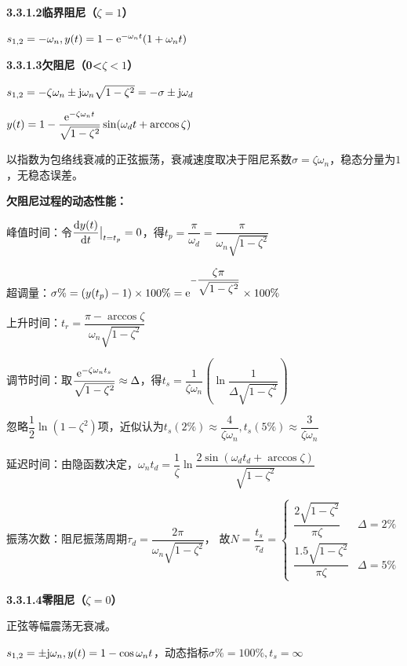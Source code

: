 \documentclass[11pt,a4paper]{ctexart}
\begin{document}
            {\setlength{\parindent}{0pt}\textbf{3.3.1.2\quad 临界阻尼（$\zeta=1$）}}

                $s_{1,2}=-\omega_n,y(t)=1-{\rm e}^{-\omega_nt}(1+\omega_nt)$

            {\setlength{\parindent}{0pt}\textbf{3.3.1.3\quad 欠阻尼（0<$\zeta<1$）}}

                $s_{1,2}=-\zeta\omega_n\pm{\rm j}\omega_n\sqrt{1-\zeta^2}=-\sigma\pm{\rm j}\omega_d$

                $y(t)=1-\dfrac{{\rm e}^{-\zeta\omega_nt}}{\sqrt{1-\zeta^2}}\sin(\omega_dt+\arccos\zeta)$

                以指数为包络线衰减的正弦振荡，衰减速度取决于阻尼系数$\sigma=\zeta\omega_n$，稳态分量为$1$，无稳态误差。

                \textbf{欠阻尼过程的动态性能：}

                峰值时间：令$\dfrac{{\rm d}y(t)}{{\rm d}t}\big|_{t=t_p}=0$，得$t_p=\dfrac{\pi}{\omega_d}=\dfrac{\pi}{\omega_n\sqrt{1-\zeta^2}}$

                超调量：$\sigma\%=(y(t_p)-1)\times100\%={\rm e}^{-\dfrac{\zeta\pi}{\sqrt{1-\zeta^2}}}\times100\%$

                上升时间：$t_r=\dfrac{\pi-\arccos\zeta}{\omega_n\sqrt{1-\zeta^2}}$

                调节时间：取$\dfrac{{\rm e}^{-\zeta\omega_nt_s}}{\sqrt{1-\zeta^2}}\approx\Delta$，得$t_s=\dfrac{1}{\zeta\omega_n}(\ln\dfrac{1}{\Delta\sqrt{1-\zeta^2}})$
                
                忽略$\dfrac12\ln(1-\zeta^2)$项，近似认为$t_s(2\%)\approx\dfrac{4}{\zeta\omega_n},t_s(5\%)\approx\dfrac{3}{\zeta\omega_n}$

                延迟时间：由隐函数决定，$\omega_nt_d=\dfrac{1}{\zeta}\ln\dfrac{2\sin(\omega_dt_d+\arccos\zeta)}{\sqrt{1-\zeta^2}}$

                振荡次数：阻尼振荡周期$\tau_d=\dfrac{2\pi}{\omega_n\sqrt{1-\zeta^2}}$，
                故$N=\dfrac{t_s}{\tau_d}=\begin{cases}\dfrac{2\sqrt{1-\zeta^2}}{\pi\zeta}&\Delta=2\%\\\dfrac{1.5\sqrt{1-\zeta^2}}{\pi\zeta}&\Delta=5\%\end{cases}$
            
            {\setlength{\parindent}{0pt}\textbf{3.3.1.4\quad 零阻尼（$\zeta=0$）}}
            
                正弦等幅震荡无衰减。

                $s_{1,2}=\pm{\rm j}\omega_n,y(t)=1-\cos\omega_nt$，动态指标$\sigma\%=100\%,t_s=\infty$
\end{document}

